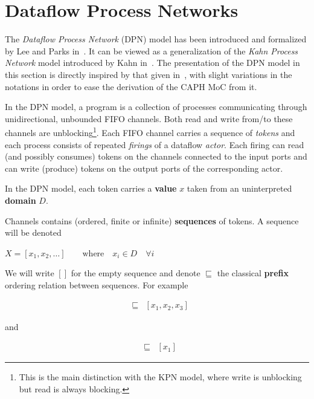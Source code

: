\section{Dataflow Process Networks}
\label{sec:dpn}

The \emph{Dataflow Process Network} (DPN) model has been introduced and formalized by Lee and Parks
in~\cite{DPN}. It can be viewed as a generalization of the \emph{Kahn Process
  Network} model introduced by Kahn in~\cite{Kahn74}. The presentation of the DPN model in this
section is directly inspired by that given in~\cite{DPN}, with slight variations in the notations
in order to ease the derivation of the CAPH MoC from it.

\medskip
In the DPN model, a program is a collection of processes communicating through unidirectional, unbounded
FIFO channels. Both read and write from/to these channels are unblocking\footnote{This is the main
  distinction with the KPN model, where write is unblocking but read is always blocking.}. Each
FIFO channel carries a sequence of \emph{tokens} and each process consists of repeated
\emph{firings} of a dataflow \emph{actor}. Each firing can read (and possibly consumes) tokens on
the channels connected to the input ports and can write (produce) tokens on the output ports of the
corresponding actor.

\medskip
\noindent
In the DPN model, each token carries a \textbf{value} $x$ taken from an uninterpreted \textbf{domain} $D$.

\medskip
\noindent
Channels contains (ordered, finite or infinite) \textbf{sequences} of tokens. A sequence will be
denoted

\begin{center}
  \begin{math}
    X = [x_1, x_2, \ldots]   \qquad \text{where} \quad x_i \in D \quad \forall i
  \end{math}
\end{center}

\medskip
\noindent
We will write $[]$ for the empty sequence and denote $\sqsubseteq$ the classical \textbf{prefix} ordering relation between
sequences. For example

\begin{eqnarray*}
    [x_1,x_2] & \sqsubseteq & [x_1,x_2,x_3]
\end{eqnarray*}

and

\begin{eqnarray*}
    [] & \sqsubseteq & [x_1]
\end{eqnarray*}

